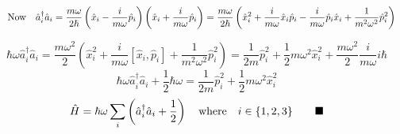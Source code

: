 \documentclass{amsart}
\begin{document}
\[\qq{Now}\hat{a}^\dagger_i\hat{a}_i=\frac{m\omega}{2\hbar}\left(\hat{x}_i-\frac{i}{m\omega}\hat{p}_i\right)\left(\hat{x}_i+\frac{i}{m\omega}\hat{p}_i\right)=\frac{m\omega}{2\hbar}\left(\hat{x}^2_i+\frac{i}{m\omega}\hat{x}_i\hat{p}_i-\frac{i}{m\omega}\hat{p}_i\hat{x}_i+\frac{1}{m^2\omega^2}\hat{p}^2_i\right)\]


\[\hbar\omega\hat{a}^\dagger_i\hat{a}_i=\frac{m\omega^2}{2}\left(\hat{x}^2_i+\frac{i}{m\omega}[\hat{x}_i,\hat{p}_i]+\frac{1}{m^2\omega^2}\hat{p}^2_i\right)=\frac{1}{2m}\hat{p}^2_i+\frac{1}{2}m\omega^2\hat{x}^2_i+\frac{m\omega^2}{2}\frac{i}{m\omega}i\hbar\]
\[\hbar\omega\hat{a}^\dagger_i\hat{a}_i+\frac{1}{2}\hbar\omega=\frac{1}{2m}\hat{p}^2_i+\frac{1}{2}m\omega^2\hat{x}^2_i\]
\[\hat{H}=\hbar\omega\sum_i\left(\hat{a}^\dagger_i\hat{a}_i+\frac{1}{2}\right)\qq{where}i\in\{1,2,3\}\qquad\blacksquare\]
\end{document}
